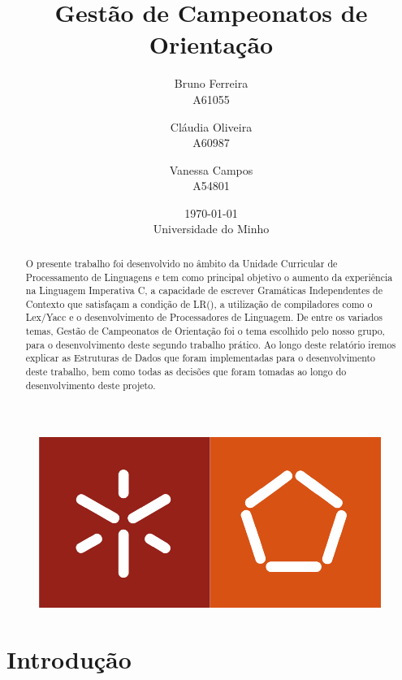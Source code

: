 \documentclass[11pt, a4paper, oneside]{article}
\begin{document}
\title{Gestão de Campeonatos de Orientação}
\date{\today\\Universidade do Minho}
\author{
  Bruno Ferreira\\
  {\small A61055}\\
  \and
  Cláudia Oliveira\\
  {\small A60987}\\
  \and
  Vanessa Campos\\
  {\small A54801}\\
}

\maketitle

\begin{figure}[h]
\begin{center}
\includegraphics[width=0.4\linewidth]{logo}
\end{center}
\end{figure}


\begin{abstract}

  O presente trabalho foi desenvolvido no âmbito da Unidade Curricular de Processamento de Linguagens e tem como principal objetivo o aumento da experiência na Linguagem Imperativa C, a capacidade de escrever Gramáticas Independentes de Contexto que satisfaçam a condição de LR(), a utilização de compiladores como o Lex/Yacc e o desenvolvimento de Processadores de Linguagem. De entre os variados temas, Gestão de Campeonatos de Orientação foi o tema escolhido pelo nosso grupo, para o desenvolvimento deste segundo trabalho prático. Ao longo deste relatório iremos explicar as Estruturas de Dados que foram implementadas para o desenvolvimento deste trabalho, bem como todas as decisões que foram tomadas ao longo do desenvolvimento deste projeto. 

\end{abstract}
\newpage

\tableofcontents
\listoffigures 

\newpage
\section{Introdução}
\end{document}
